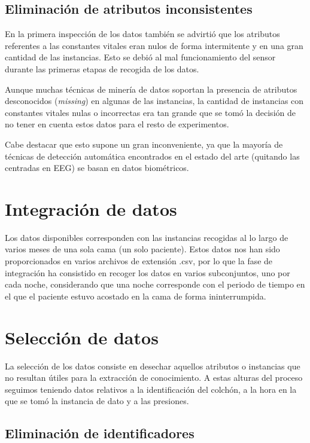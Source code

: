 \subsection{Eliminación de atributos inconsistentes}

En la primera inspección de los datos también se advirtió que los atributos referentes a las constantes vitales eran nulos de forma intermitente y en una gran cantidad de las instancias. Esto se debió al mal funcionamiento del sensor durante las primeras etapas de recogida de los datos. 

Aunque muchas técnicas de minería de datos soportan la presencia de atributos desconocidos (\textit{missing}) en algunas de las instancias, la cantidad de instancias con constantes vitales nulas o incorrectas era tan grande que se tomó la decisión de no tener en cuenta estos datos para el resto de experimentos.  

Cabe destacar que esto supone un gran inconveniente, ya que la mayoría de técnicas de detección automática encontrados en el estado del arte (quitando las centradas en EEG) se basan en datos biométricos. 

\section{Integración de datos}

Los datos disponibles corresponden con las instancias recogidas al lo largo de varios meses de una sola cama (un solo paciente). Estos datos nos han sido proporcionados en varios archivos de extensión .csv, por lo que la fase de integración ha consistido en recoger los datos en varios subconjuntos, uno por cada noche, considerando que una noche corresponde con el periodo de tiempo en el que el paciente estuvo acostado en la cama de forma ininterrumpida. 

\section{Selección de datos}

La selección de los datos consiste en desechar aquellos atributos o instancias que no resultan útiles para la extracción de conocimiento. A estas alturas del proceso seguimos teniendo datos relativos a la identificación del colchón, a la hora en la que se tomó la instancia de dato y a las presiones. 

\subsection{Eliminación de identificadores}

